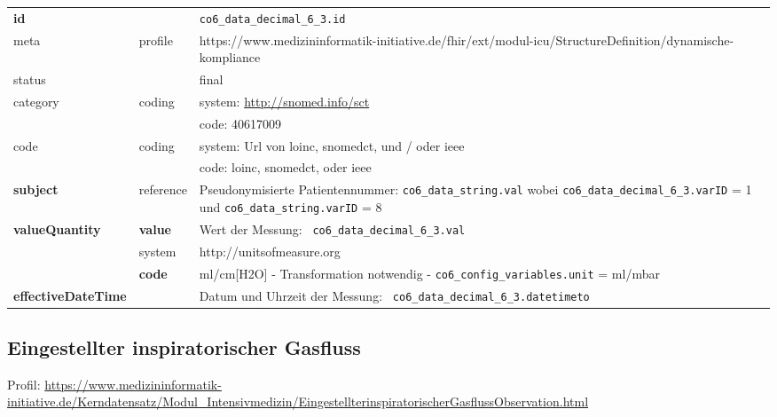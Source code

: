 \begin{longtable}{|l|l|p{7.5cm}|}
	\hline
	\rowcolor{lightgray} \multicolumn{3}{|l|}{Data Mapping (inhaltlich)} \\ \hline
	\textbf{id} &  & \texttt{co6\_data\_decimal\_6\_3.id} \\ \hline
	meta & profile & https://www.medizininformatik-initiative.de/fhir/ext/modul-icu/StructureDefinition/dynamische-kompliance \\ \hline 
	status &  & final   \\ \hline 
	category & coding & system: \url{http://snomed.info/sct} \\
	\cline{3-3}
	& & code: 40617009 \\ \hline
	code & coding & system: Url von \ac{loinc}, \ac{snomedct}, und / oder \ac{ieee} \\ 
	\cline{3-3} 
	&  & code: \ac{loinc}, \ac{snomedct}, oder \ac{ieee} \\ \hline
	\textbf{subject} & reference & Pseudonymisierte Patientennummer: \texttt{co6\_data\_string.val} wobei \texttt{co6\_data\_decimal\_6\_3.varID} = 1 und \texttt{co6\_data\_string.varID} = 8 \\ \hline
	\textbf{valueQuantity}  & \textbf{value} & Wert der Messung: \texttt{
		co6\_data\_decimal\_6\_3.val} \\
	\cline{2-3}
	& system & http://unitsofmeasure.org \\
	\cline{2-3}
	& \textbf{code} &
	ml/cm[H2O] - Transformation notwendig - \texttt{co6\_config\_variables.unit} = ml/mbar
	\\ \hline
	\textbf{effectiveDateTime}  & & Datum und Uhrzeit der Messung: \texttt{
		co6\_data\_decimal\_6\_3.datetimeto} \\ \hline
\end{longtable}

\subsection{Eingestellter inspiratorischer Gasfluss} 

Profil: \url{https://www.medizininformatik-initiative.de/Kerndatensatz/Modul_Intensivmedizin/EingestellterinspiratorischerGasflussObservation.html}

